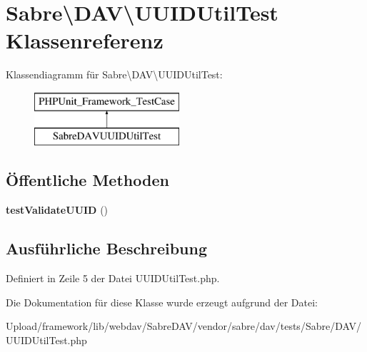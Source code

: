 \hypertarget{class_sabre_1_1_d_a_v_1_1_u_u_i_d_util_test}{}\section{Sabre\textbackslash{}D\+AV\textbackslash{}U\+U\+I\+D\+Util\+Test Klassenreferenz}
\label{class_sabre_1_1_d_a_v_1_1_u_u_i_d_util_test}
Klassendiagramm für Sabre\textbackslash{}D\+AV\textbackslash{}U\+U\+I\+D\+Util\+Test\+:\begin{figure}[H]
\begin{center}
\leavevmode
\includegraphics[height=2.000000cm]{class_sabre_1_1_d_a_v_1_1_u_u_i_d_util_test}
\end{center}
\end{figure}
\subsection*{Öffentliche Methoden}
\begin{DoxyCompactItemize}
\item 
\mbox{\label{class_sabre_1_1_d_a_v_1_1_u_u_i_d_util_test_a8dd0b567817693dac7c06c05475a0590}} 
{\bfseries test\+Validate\+U\+U\+ID} ()
\end{DoxyCompactItemize}


\subsection{Ausführliche Beschreibung}


Definiert in Zeile 5 der Datei U\+U\+I\+D\+Util\+Test.\+php.



Die Dokumentation für diese Klasse wurde erzeugt aufgrund der Datei\+:\begin{DoxyCompactItemize}
\item 
Upload/framework/lib/webdav/\+Sabre\+D\+A\+V/vendor/sabre/dav/tests/\+Sabre/\+D\+A\+V/U\+U\+I\+D\+Util\+Test.\+php\end{DoxyCompactItemize}

